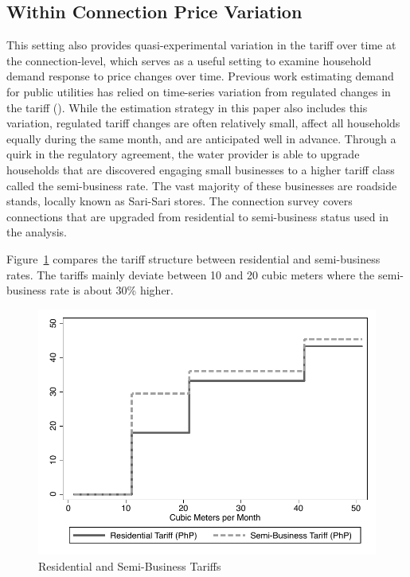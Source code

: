 \documentclass[12pt]{article}
\begin{document}
\begin{appendices}
\subsection{Within Connection Price Variation}\label{appendix:ratechangeelasticity}

This setting also provides quasi-experimental variation in the tariff over time at the connection-level, which serves as a useful setting to examine household demand response to price changes over time.  Previous work estimating demand for public utilities has relied on time-series variation from regulated changes in the tariff (\cite{szabo2015value,mcrae2014infrastructure}).  While the estimation strategy in this paper also includes this variation, regulated tariff changes are often relatively small, affect all households equally during the same month, and are anticipated well in advance.  Through a quirk in the regulatory agreement, the water provider is able to upgrade households that are discovered engaging small businesses to a higher tariff class called the semi-business rate.  The vast majority of these businesses are roadside stands, locally known as Sari-Sari stores.  The connection survey covers connections that are upgraded from residential to semi-business status used in the analysis.


Figure~\ref{figure:ressemi} compares the tariff structure between residential and semi-business rates.  The tariffs mainly deviate between 10 and 20 cubic meters where the semi-business rate is about 30\% higher.

\begin{figure}
\caption{Residential and Semi-Business Tariffs}\label{figure:ressemi}
\begin{center}
\includegraphics[scale=.65]{tables/res_semi_tariff.pdf}
\end{center}
\end{figure}


\end{appendices}
\end{document}
